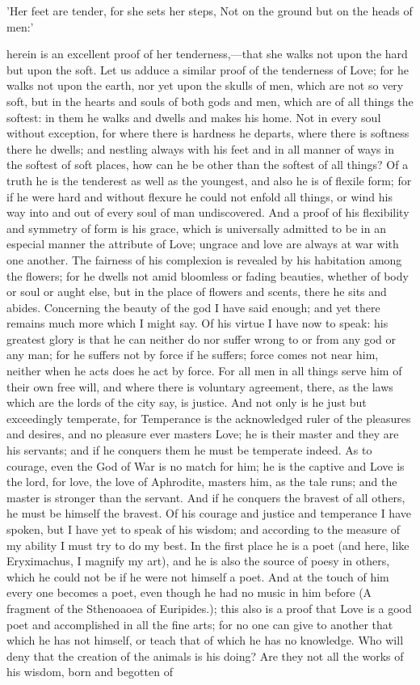 \para[75] 'Her feet are tender, for she sets her steps, Not on the ground but on the heads of men:'

\para[76] herein is an excellent proof of her tenderness,---that she walks not upon the hard but upon the soft. Let us adduce a similar proof of the tenderness of Love; for he walks not upon the earth, nor yet upon the skulls of men, which are not so very soft, but in the hearts and souls of both gods and men, which are of all things the softest: in them he walks and dwells and makes his home. Not in every soul without exception, for where there is hardness he departs, where there is softness there he dwells; and nestling always with his feet and in all manner of ways in the softest of soft places, how can he be other than the softest of all things? Of a truth he is the tenderest as well as the youngest, and also he is of flexile form; for if he were hard and without flexure he could not enfold all things, or wind his way into and out of every soul of man undiscovered. And a proof of his flexibility and symmetry of form is his grace, which is universally admitted to be in an especial manner the attribute of Love; ungrace and love are always at war with one another. The fairness of his complexion is revealed by his habitation among the flowers; for he dwells not amid bloomless or fading beauties, whether of body or soul or aught else, but in the place of flowers and scents, there he sits and abides. Concerning the beauty of the god I have said enough; and yet there remains much more which I might say. Of his virtue I have now to speak: his greatest glory is that he can neither do nor suffer wrong to or from any god or any man; for he suffers not by force if he suffers; force comes not near him, neither when he acts does he act by force. For all men in all things serve him of their own free will, and where there is voluntary agreement, there, as the laws which are the lords of the city say, is justice. And not only is he just but exceedingly temperate, for Temperance is the acknowledged ruler of the pleasures and desires, and no pleasure ever masters Love; he is their master and they are his servants; and if he conquers them he must be temperate indeed. As to courage, even the God of War is no match for him; he is the captive and Love is the lord, for love, the love of Aphrodite, masters him, as the tale runs; and the master is stronger than the servant. And if he conquers the bravest of all others, he must be himself the bravest. Of his courage and justice and temperance I have spoken, but I have yet to speak of his wisdom; and according to the measure of my ability I must try to do my best. In the first place he is a poet (and here, like Eryximachus, I magnify my art), and he is also the source of poesy in others, which he could not be if he were not himself a poet. And at the touch of him every one becomes a poet, even though he had no music in him before (A fragment of the Sthenoaoea of Euripides.); this also is a proof that Love is a good poet and accomplished in all the fine arts; for no one can give to another that which he has not himself, or teach that of which he has no knowledge. Who will deny that the creation of the animals is his doing? Are they not all the works of his wisdom, born and begotten of 